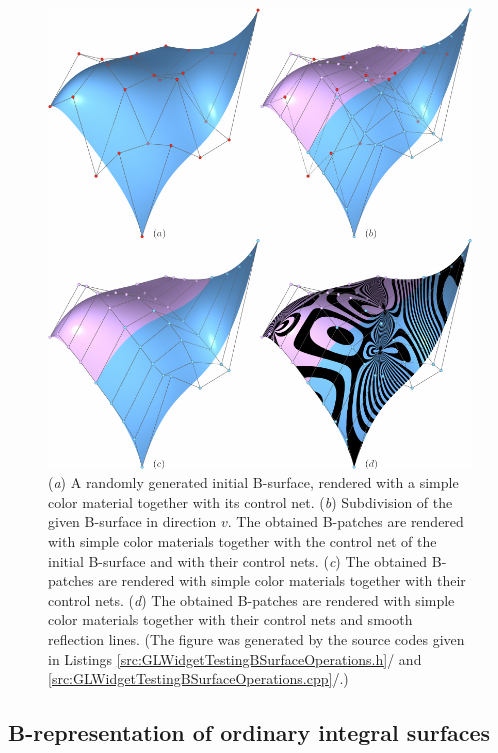 \documentclass[b5paper, twosided]{book}
\DeclareRobustCommand{\mref}[1]{\ref{#1}{\relsize{-1}/\pageref{#1}}}
\begin{document}
\begin{figure}[!htb]
    \centering
    \includegraphics[]{images/B_surface_subdivision_v.pdf}
    \caption{(\textit{a}) A randomly generated initial B-surface, rendered with a simple color material together with its control net. (\textit{b}) Subdivision of the given B-surface in direction $v$. The obtained B-patches are rendered with simple color materials together with the control net of the initial B-surface and with their control nets. (\textit{c}) The obtained B-patches are rendered with simple color materials together with their control nets. (\textit{d}) The obtained B-patches are rendered with simple color materials together with their control nets and smooth reflection lines. (The figure was generated by the source codes given in Listings \mref{src:GLWidgetTestingBSurfaceOperations.h} and \mref{src:GLWidgetTestingBSurfaceOperations.cpp}.)}
    \label{fig:B_surface_subdivision_v}
\end{figure}

\subsection{B-representation of ordinary integral surfaces}\label{subsec:B-representation_of_ordinary_integral_surfaces}
\end{document}
